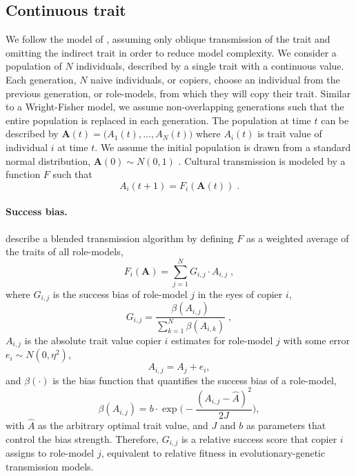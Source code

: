 \documentclass[12pt]{extarticle}
\let\vec\mathbf
\begin{document}
\subsection*{Continuous trait}
We follow the model of \citet{evolutionBook}, assuming only oblique transmission of the trait and omitting the indirect trait in order to reduce model complexity. 
We consider a population of $N$ individuals, described by a single trait with a continuous value.
Each generation, $N$ naive individuals, or copiers, choose an individual from the previous generation, or role-models, from which they will copy their trait. Similar to a Wright-Fisher model, we assume non-overlapping generations such that the entire population is replaced in each generation.
The population at time $t$ can be described by $\vec{A}(t)=\big(A_{1}(t), \ldots, A_{N}(t)\big)$ where $A_{i}(t)$ is trait value of individual $i$ at time $t$. We assume the initial population is drawn from a standard normal distribution, $\vec{A}(0) \sim N(0,1)$ .
Cultural transmission is modeled by a function $F$ such that 
\begin{equation}\label{eq:transmission}
A_{i}(t+1) = F_i(\vec{A}(t)) \;.
\end{equation}

\paragraph{Success bias.}
\citet[Ch.~8, p.~247-249]{evolutionBook} describe a blended transmission algorithm by defining $F$ as a weighted average of the traits of all role-models, 
\begin{equation}\label{eq:boydF}
F_i(\vec{A}) = \sum_{j=1}^N G_{i,j}\cdot A_{i,j} \;, 
\end{equation}
where $G_{i,j}$ is the success bias of role-model $j$ in the eyes of copier $i$,
\begin{equation}\label{eq:boydG}
G_{i,j} = \frac{\beta(A_{i,j})}{\sum_{k=1}^{N} \beta(A_{i,k})} \;,
\end{equation}
$A_{i,j}$ is the absolute trait value copier $i$ estimates for role-model $j$ with some error $e_i \sim N(0,\eta^2)$,
\begin{equation}\label{eq:relativeTrait}
A_{i,j} = A_j + e_i,
\end{equation}
and $\beta(\cdot)$ is the bias function that quantifies the success bias of a role-model,
\begin{equation}\label{eq:success_bias}
\beta(A_{i,j}) = b \cdot \exp{\Big(-\frac{(A_{i,j} - \hat{A})^2}{2J}\Big)},
\end{equation} 
with $\hat{A}$ as the arbitrary optimal trait value, and $J$ and $b$ as parameters that control the bias strength.
Therefore, $G_{i,j}$ is a relative success score that copier $i$ assigns to role-model $j$, equivalent to relative fitness in evolutionary-genetic transmission models.
\end{document}
